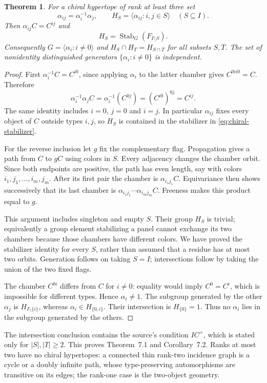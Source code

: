 \documentclass[11pt,a4paper]{article}
\newtheorem{theorem}{Theorem}[section]
\newcommand{\gen}[1]{\langle#1\rangle}
\newcommand{\Stab}{\operatorname{Stab}}
\begin{document}
\begin{theorem}\label{thm:chiral}
For a chiral hypertope of rank at least three set
\[
 \alpha_{ij}=\alpha_i^{-1}\alpha_j,\qquad
 H_S=\gen{\alpha_{ij}:i,j\in S}\quad(S\subseteq I).
\]
Then $\alpha_{ij}C=C^{ij}$ and
\begin{equation}\label{eq:chiral-stabilizer}
                 H_S=\Stab_G(F_{I\setminus S}).
\end{equation}
Consequently $G=\gen{\alpha_i:i\ne0}$ and
$H_S\cap H_T=H_{S\cap T}$ for all subsets $S,T$.  The set of nonidentity
distinguished generators $\{\alpha_i:i\ne0\}$ is independent.
\end{theorem}
\begin{proof}
First $\alpha_i^{-1}C=C^{i0}$, since applying $\alpha_i$ to the latter
chamber gives $C^{0ii0}=C$.  Therefore
\[
 \alpha_i^{-1}\alpha_jC
       =\alpha_i^{-1}(C^{0j})=(C^{i0})^{0j}=C^{ij}.
\]
The same identity includes $i=0$, $j=0$ and $i=j$.  In particular
$\alpha_{ij}$ fixes every object of $C$ outside types $i,j$, so
$H_S$ is contained in the stabilizer in \eqref{eq:chiral-stabilizer}.

For the reverse inclusion let $g$ fix the complementary flag.  Propagation
gives a path from $C$ to $gC$ using colors in $S$.  Every adjacency changes
the chamber orbit.  Since both endpoints are positive, the path has even
length, say with colors $i_1,j_1,\ldots,i_m,j_m$.  After its first pair
the chamber is $\alpha_{i_1j_1}C$.  Equivariance then shows successively
that its last chamber is
$\alpha_{i_1j_1}\cdots\alpha_{i_mj_m}C$.
Freeness makes this product equal to $g$.

This argument includes singleton and empty $S$.  Their group $H_S$ is
trivial; equivalently a group element stabilizing a panel cannot exchange
its two chambers because those chambers have different colors.  We have
proved the stabilizer identity for every $S$, rather than assumed that a
residue has at most two orbits.  Generation follows on taking $S=I$;
intersections follow by taking the union of the two fixed flags.

The chamber $C^{0i}$ differs from $C$ for $i\ne0$: equality would imply
$C^0=C^i$, which is impossible for different types.  Hence $\alpha_i\ne1$.
The subgroup generated by the other $\alpha_j$ is
$H_{I\setminus\{i\}}$, whereas $\alpha_i\in H_{\{0,i\}}$.  Their
intersection is $H_{\{0\}}=1$.  Thus no $\alpha_i$ lies in the subgroup
generated by the others.
\end{proof}

The intersection conclusion contains the source's condition $IC^+$, which
is stated only for $|S|,|T|\ge2$.  This proves Theorem~7.1 and
Corollary~7.2.  Ranks at most two have no chiral hypertopes: a connected
thin rank-two incidence graph is a cycle or a doubly infinite path, whose
type-preserving automorphisms are transitive on its edges; the rank-one
case is the two-object geometry.
\end{document}
